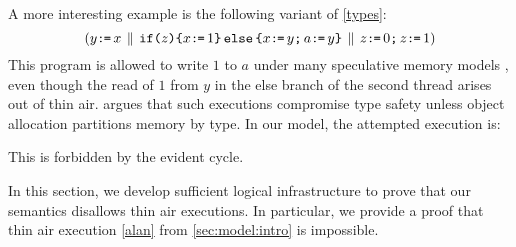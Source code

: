A more interesting example is the following variant of \eqref{types}:
\begin{displaymath}
  (
    y\texttt{:}\mkern-1mu\texttt{=}\, x
  \,\mathbin{\|}\,
    \texttt{if}\allowbreak\texttt{(}z\texttt{)}\allowbreak\texttt{\{} x\texttt{:}\mkern-1mu\texttt{=}\,1 \texttt{\}}\,\allowbreak\texttt{else}\allowbreak\,\texttt{\{} x\texttt{:}\mkern-1mu\texttt{=}\, y\texttt{;}\,\allowbreak a\texttt{:}\mkern-1mu\texttt{=}\, y \texttt{\}}
  \,\mathbin{\|}\,
    z\texttt{:}\mkern-1mu\texttt{=}\,0\texttt{;}\,\allowbreak z\texttt{:}\mkern-1mu\texttt{=}\,1
  )
\end{displaymath}
This program is allowed to write $1$ to $a$ under many speculative
memory models
\cite{Manson:2005:JMM:1047659.1040336,DBLP:conf/esop/JagadeesanPR10,DBLP:conf/popl/KangHLVD17},
even though the read of $1$ from $y$ in the else branch of the second
thread arises out of thin air.   \citet{DBLP:journals/toplas/Lochbihler13}
argues that such executions compromise type safety unless object allocation
partitions memory by type.
In our model, the attempted execution is:
\begin{tikzdisplay}[node distance=1em]
\end{tikzdisplay}
This is forbidden by the evident cycle.


In this section, we develop sufficient logical infrastructure to prove that
our semantics disallows thin air executions.  In particular, we provide a
proof that thin air execution \eqref{alan} from
\textsection\ref{sec:model:intro} is impossible.

